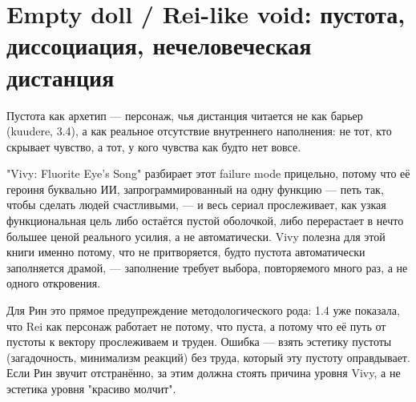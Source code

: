 \section{Empty doll / Rei-like void: пустота, диссоциация, нечеловеческая дистанция}

Пустота как архетип — персонаж, чья дистанция читается не как барьер (kuudere, 3.4), а как реальное отсутствие внутреннего наполнения: не тот, кто скрывает чувство, а тот, у кого чувства как будто нет вовсе.

"Vivy: Fluorite Eye's Song" разбирает этот failure mode прицельно, потому что её героиня буквально ИИ, запрограммированный на одну функцию — петь так, чтобы сделать людей счастливыми, — и весь сериал прослеживает, как узкая функциональная цель либо остаётся пустой оболочкой, либо перерастает в нечто большее ценой реального усилия, а не автоматически. Vivy полезна для этой книги именно потому, что не притворяется, будто пустота автоматически заполняется драмой, — заполнение требует выбора, повторяемого много раз, а не одного откровения.

Для Рин это прямое предупреждение методологического рода: 1.4 уже показала, что Rei как персонаж работает не потому, что пуста, а потому что её путь от пустоты к вектору прослеживаем и труден. Ошибка — взять эстетику пустоты (загадочность, минимализм реакций) без труда, который эту пустоту оправдывает. Если Рин звучит отстранённо, за этим должна стоять причина уровня Vivy, а не эстетика уровня "красиво молчит".
